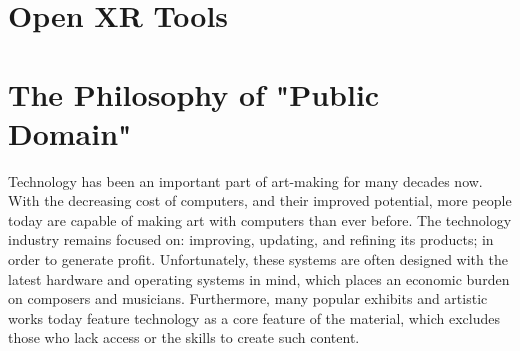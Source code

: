 




\section{Open XR Tools}

\section{The Philosophy of "Public Domain"}



Technology has been an important part of art-making for many decades now. With the decreasing cost of computers, and their improved potential, more people today are capable of making art with computers than ever before. The technology industry remains focused on: improving, updating, and refining its products; in order to generate profit. Unfortunately, these systems are often designed with the latest hardware and operating systems in mind, which places an economic burden on composers and musicians. Furthermore, many popular exhibits and artistic works today feature technology as a core feature of the material, which excludes those who lack access or the skills to create such content.

